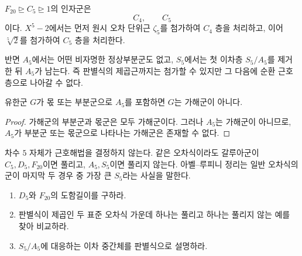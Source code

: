 \begin{example}[$F_{20}$의 두 단계]
$F_{20}\trianglerighteq C_5\trianglerighteq1$의 인자군은
\[
  C_4,\qquad C_5
\]
이다. $X^5-2$에서는 먼저 원시 오차 단위근 $\zeta_5$를 첨가하여 $C_4$ 층을 처리하고, 이어 $\sqrt[5]{2}$를 첨가하여 $C_5$ 층을 처리한다.
\end{example}

반면 $A_5$에서는 어떤 비자명한 정상부분군도 없고, $S_5$에서는 첫 이차층 $S_5/A_5$를 제거한 뒤 $A_5$가 남는다. 즉 판별식의 제곱근까지는 첨가할 수 있지만 그 다음에 순환 근호층으로 나아갈 수 없다.

\begin{proposition}[비가해 핵의 보존]
\label{prop-nonsolvable-core-obstruction}
유한군 $G$가 몫 또는 부분군으로 $A_5$를 포함하면 $G$는 가해군이 아니다.
\end{proposition}

\begin{proof}
가해군의 부분군과 몫군은 모두 가해군이다. 그러나 $A_5$는 가해군이 아니므로, $A_5$가 부분군 또는 몫군으로 나타나는 가해군은 존재할 수 없다.
\end{proof}

\begin{keyidea}
차수 $5$ 자체가 근호해법을 결정하지 않는다. 같은 오차식이라도 갈루아군이 $C_5,D_5,F_{20}$이면 풀리고, $A_5,S_5$이면 풀리지 않는다. 아벨--루피니 정리는 일반 오차식의 군이 마지막 두 경우 중 가장 큰 $S_5$라는 사실을 말한다.
\end{keyidea}

\begin{checkpoint}
\begin{enumerate}[label=(\alph*)]
  \item $D_5$와 $F_{20}$의 도함길이를 구하라.
  \item 판별식이 제곱인 두 표준 오차식 가운데 하나는 풀리고 하나는 풀리지 않는 예를 찾아 비교하라.
  \item $S_5/A_5$에 대응하는 이차 중간체를 판별식으로 설명하라.
\end{enumerate}
\end{checkpoint}
